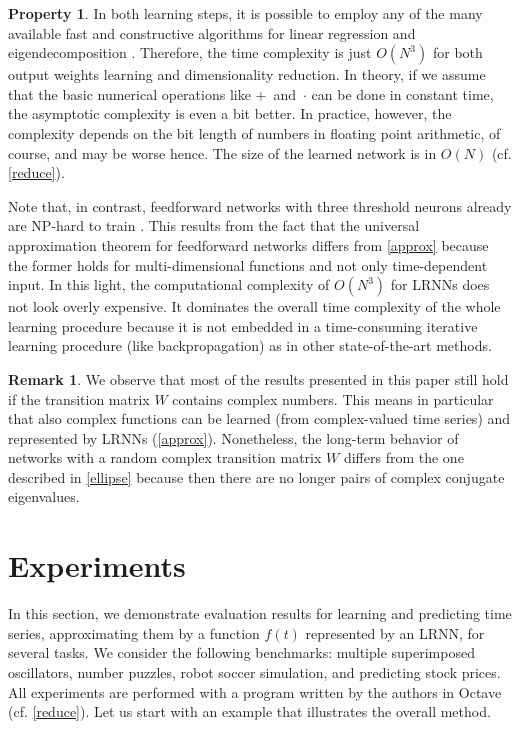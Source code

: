 \documentclass[twoside,11pt]{article}
\theoremstyle{definition}
\newtheorem{prop}{Property}
\newtheorem{remk}{Remark}
\begin{document}
\begin{prop}\label{complexity}
In both learning steps, it is possible to employ any of the many available fast
and constructive algorithms for linear regression and eigendecomposition
\citep{DDH07}. Therefore, the time complexity is just $O(N^3)$ for both output
weights learning and dimensionality reduction. In theory, if we assume that
the basic numerical operations like $+$~and~$\cdot$ can be done in constant
time, the asymptotic complexity is even a bit better. In practice, however, the
complexity depends on the bit length of numbers in floating point arithmetic,
of course, and may be worse hence. The size of the learned network is in $O(N)$
(cf. \cref{reduce}).
\end{prop}

Note that, in contrast, feedforward networks with three threshold neurons
already are NP-hard to train \citep{BR92}. This results from the fact
that the universal approximation theorem for feedforward networks differs from
\cref{approx} because the former holds for multi-dimensional functions and
not only time-dependent input. In this light, the computational complexity of
$O(N^3)$ for LRNNs does not look overly expensive. It dominates the
overall time complexity of the whole learning procedure because it is not
embedded in a time-consuming iterative learning procedure (like backpropagation)
as in other state-of-the-art methods.

\begin{remk}
We observe that most of the results presented in this paper still
hold if the transition matrix $W$ contains complex numbers. This means in
particular that also complex functions can be learned (from complex-valued time
series) and represented by LRNNs (\cref{approx}).
Nonetheless, the long-term behavior of networks with a random complex transition
matrix $W$ differs from the one described in \cref{ellipse} because then
there are no longer pairs of complex conjugate eigenvalues.
\end{remk}

\section{Experiments}\label{result}

In this section, we demonstrate evaluation results for learning and predicting
time series, approximating them by a function $f(t)$ represented by an LRNN,
for several tasks. We consider the following benchmarks: multiple superimposed
oscillators, number puzzles, robot soccer simulation, and predicting stock
prices. All experiments are performed with a program written by the authors in
Octave \citep{EB+17} (cf. \cref{reduce}). Let us start with an example that
illustrates the overall method.
\end{document}
